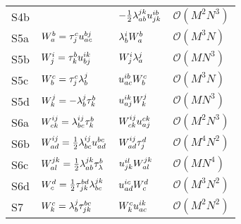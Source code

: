 \begin{center}
\begin{longtable}{@{}llll@{}}
                S4b
                &
                & $-\frac{1}{2} \lambda^{jk}_{ab} u^{ib}_{jk}$
                & $\mathcal{O}(M^2 N^3)$
                \\

                S5a
                & $W^{b}_{a} = \tau^{c}_{j} u^{bj}_{ac}$
                & $\lambda^{i}_{b} W^{b}_{a}$
                & $\mathcal{O}(M^3 N)$
                \\

                S5b
                & $W^{i}_{j} = \tau^{b}_{k} u^{ik}_{bj}$
                & $W^{i}_{j} \lambda^{j}_{a}$
                & $\mathcal{O}(M N^3)$
                \\

                S5c
                & $W^{c}_{b} = \tau^{c}_{j} \lambda^{j}_{b}$
                & $u^{ib}_{ac} W^{c}_{b}$
                & $\mathcal{O}(M^3 N)$
                \\

                S5d
                & $W^{j}_{k} = -\lambda^{j}_{b} \tau^{b}_{k}$
                & $u^{ik}_{aj} W^{j}_{k}$
                & $\mathcal{O}(M N^3)$
                \\

                S6a
                & $W^{ij}_{ck} = \lambda^{ij}_{bc} \tau^{b}_{k}$
                & $W^{ij}_{ck} u^{ck}_{aj}$
                & $\mathcal{O}(M^2 N^3)$
                \\

                S6b
                & $W^{ij}_{ad} = \frac{1}{2} \lambda^{ij}_{bc} u^{bc}_{ad}$
                & $W^{ij}_{ad} \tau^{d}_{j}$
                & $\mathcal{O}(M^4 N^2)$
                \\

                S6c
                & $W^{jk}_{al} = \frac{1}{2} \lambda^{jk}_{ab} \tau^{b}_{\lambda}$
                & $u^{il}_{jk} W^{jk}_{al}$
                & $\mathcal{O}(M N^4)$
                \\

                S6d
                & $W^{d}_{c} = \frac{1}{2} \tau^{bd}_{jk} \lambda^{jk}_{bc}$
                & $u^{ic}_{ad} W^{d}_{c}$
                & $\mathcal{O}(M^3 N^2)$
                \\

                S7
                & $W^{c}_{k} = \lambda^{j}_{b} \tau^{bc}_{jk}$
                & $W^{c}_{k} u^{ik}_{ac}$
                & $\mathcal{O}(M^2 N^2)$
                \\


\end{longtable}
\end{center}
